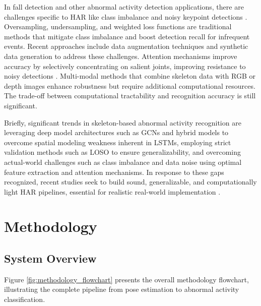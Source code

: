 \documentclass{iopconfser}
\begin{document}
In fall detection and other abnormal activity detection applications, there are challenges specific to HAR like class imbalance and noisy keypoint detections \cite{kwolek2014human}. Oversampling, undersampling, and weighted loss functions are traditional methods that mitigate class imbalance and boost detection recall for infrequent events. Recent approaches include data augmentation techniques \cite{chen2021learning} and synthetic data generation \cite{wang2019deep} to address these challenges. Attention mechanisms improve accuracy by selectively concentrating on salient joints, improving resistance to noisy detections \cite{yan2018spatial}. Multi-modal methods that combine skeleton data with RGB or depth images enhance robustness but require additional computational resources. The trade-off between computational tractability and recognition accuracy is still significant.

Briefly, significant trends in skeleton-based abnormal activity recognition are leveraging deep model architectures such as GCNs and hybrid models to overcome spatial modeling weakness inherent in LSTMs, employing strict validation methods such as LOSO to ensure generalizability, and overcoming actual-world challenges such as class imbalance and data noise using optimal feature extraction and attention mechanisms. In response to these gaps recognized, recent studies seek to build sound, generalizable, and computationally light HAR pipelines, essential for realistic real-world implementation \cite{yan2018spatial,lee2017ensemble,braganca2022validation,shahroudy2016ntu}.

\section{Methodology}

\subsection{System Overview}

Figure \ref{fig:methodology_flowchart} presents the overall methodology flowchart, illustrating the complete pipeline from pose estimation to abnormal activity classification.
\end{document}
